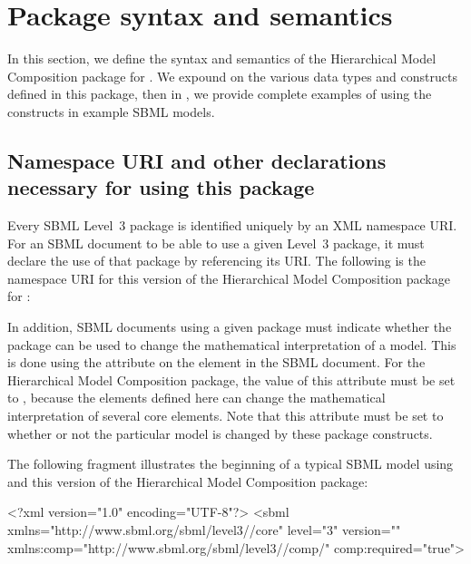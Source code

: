 
\newcommand{\fixttspace}{\hspace*{1pt}}

\section{Package syntax and semantics}
\label{sec:syntax}

In this section, we define the syntax and semantics of the Hierarchical Model Composition package for \sbmlthreecore.  We expound on the various data types and constructs defined in this package, then in , we provide complete examples of using the constructs in example SBML models.

\subsection{Namespace URI and other declarations necessary for using this package}
\label{xml-namespace}

Every SBML Level~3 package is identified uniquely by an XML namespace URI.  For an SBML document to be able to use a given Level~3 package, it must declare the use of that package by referencing its URI. The following is the namespace URI for this version of the Hierarchical Model Composition package for \sbmlthreecore:
\begin{center}
\end{center}

In addition, SBML documents using a given package must indicate whether the package can be used to change the mathematical interpretation of a model.  This is done using the attribute  on the  element in the SBML document.  For the Hierarchical Model Composition package, the value of this attribute must be set to , because the elements defined here can change the mathematical interpretation of several core elements.  Note that this attribute must be set to  whether or not the particular model is changed by these package constructs.

The following fragment illustrates the beginning of a typical SBML model using \sbmlthreecore and this version of the Hierarchical Model Composition package:

\begin{example}
<?xml version="1.0" encoding="UTF-8"?>
<sbml xmlns="http://www.sbml.org/sbml/level3//core" level="3" version=""
      xmlns:comp="http://www.sbml.org/sbml/level3//comp/" comp:required="true">
\end{example}
   

